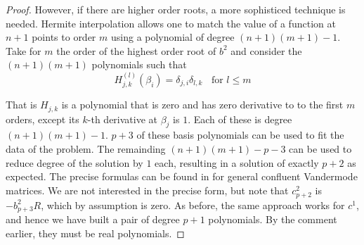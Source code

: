 \begin{lem}
\begin{proof}
However, if there are higher order roots, a more sophisticed technique is needed. Hermite interpolation allows one to match the value of a function at $n+1$ points to order $m$ using a polynomial of degree $(n+1)(m+1)-1$. Take for $m$ the order of the highest order root of $b^2$ and consider the $(n+1)(m+1)$ polynomials such that
\[
H_{j,k}^{(l)}(β_i) = δ_{j,i}δ_{l,k}\;\;\text{ for }  l \leq m
\]

That is $H_{j,k}$ is a polynomial that is zero and has zero derivative to to the first $m$ orders, except its $k$-th derivative at $β_j$ is $1$. Each of these is degree $(n+1)(m+1)-1$. $p+3$ of these basis polynomials can be used to fit the data of the problem. The remainding $(n+1)(m+1)-p-3$ can be used to reduce degree of the solution by $1$ each, resulting in a solution of exactly $p+2$ as expected. The precise formulas can be found in  \cite{Spitzbart1960} for general confluent Vandermode matrices. We are not interested in the precise form, but note that $c^2_{p+2}$ is $-b^2_{p+3}R$, which by assumption is zero. As before, the same approach works for $c^1$, and hence we have built a pair of degree $p+1$ polynomials. By the comment earlier, they must be real polynomials.

\end{proof}
\end{lem}












